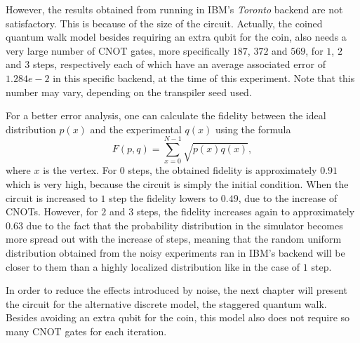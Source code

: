 \documentclass[../../dissertation.tex]{subfiles}
\begin{document}
However, the results obtained from running in IBM's \textit{Toronto} backend
are not satisfactory. This is because of the size of the circuit. Actually, the coined
quantum walk model besides requiring an extra qubit for the coin, also needs a
very large number of CNOT gates, more specifically $187$, $372$ and $569$, for $1$, $2$ and $3$ steps, respectively
each of which have an average associated error of
$1.284e-2$ in this specific backend, at the time of this experiment. Note that this number may vary, depending on the transpiler seed used. \par

For a better error analysis, one can calculate the fidelity between the
ideal distribution $p(x)$ and the experimental $q(x)$ using the formula
\begin{equation}
    F(p,q) = \sum_{x=0}^{N-1} \sqrt{p(x)q(x)},
    \label{eq:bestFid}
\end{equation}
where $x$ is the vertex. For $0$ steps, the obtained fidelity is approximately
$0.91$ which is very high, because the circuit is simply the initial condition. When the circuit is increased to $1$ step the fidelity lowers to $0.49$,
due to the increase of CNOTs. However, for $2$ and $3$ steps, the fidelity
increases again to approximately $0.63$ due to the fact that the probability
distribution in the simulator becomes more spread out with the increase of
steps, meaning that the random uniform distribution obtained from the noisy
experiments ran in IBM's backend will be closer to them than a highly localized
distribution like in the case of $1$ step.\par

In order to reduce the effects introduced by noise, the next chapter will
present the circuit for the alternative discrete model, the staggered quantum
walk. Besides avoiding an extra qubit for the coin, this model also does not
require so many CNOT gates for each iteration.
\end{document}
